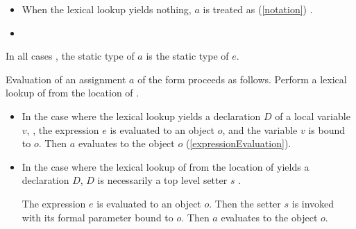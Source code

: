 \documentclass[makeidx]{article}
\begin{document}
{\begin{itemize}
  If $D$ is the declaration of a static setter in class or mixin $C$
  then $a$ is treated as
  (\ref{notation})
  the assignment .


  Otherwise, a compile-time error occurs,
  unless the static type of $e$ is assignable to the parameter type of $D$.
\item
  When the lexical lookup yields nothing,
  $a$ is treated as
  (\ref{notation})
  .

\item
\end{itemize}

\LMHash{}%
In all cases
,
the static type of $a$ is the static type of $e$.

\LMHash{}%
Evaluation of an assignment $a$ of the form 
proceeds as follows.
Perform a lexical lookup of \code{\id=} from the location of \id.

\begin{itemize}
\item
  In the case where the lexical lookup yields
  a declaration $D$ of a local variable $v$,
  ,
  the expression $e$ is evaluated to an object $o$,
  and the variable $v$ is bound to $o$.
  Then $a$ evaluates to the object $o$
  (\ref{expressionEvaluation}).
\item
  In the case where the lexical lookup of \code{\id=}
  from the location of \id{}
  yields a declaration $D$,
  $D$ is necessarily a top level setter $s$
  .

  The expression $e$ is evaluated to an object $o$.
  Then the setter $s$ is invoked
  with its formal parameter bound to $o$.
  Then $a$ evaluates to the object $o$.


\end{itemize}}
\end{document}
